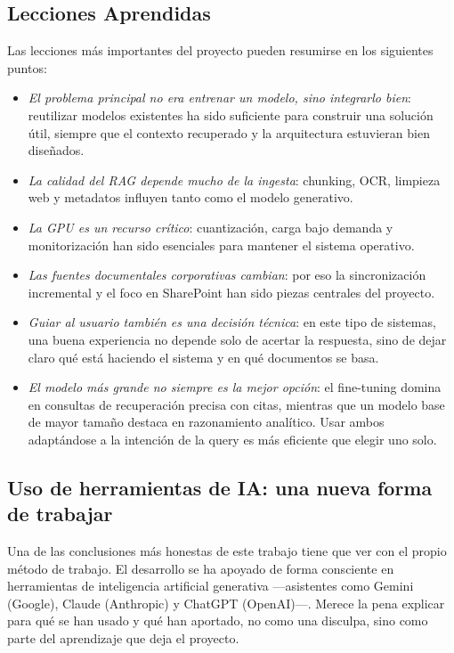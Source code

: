 \subsection{Lecciones Aprendidas}

Las lecciones más importantes del proyecto pueden resumirse en los siguientes puntos:

\begin{itemize}
    \item \textit{El problema principal no era entrenar un modelo, sino integrarlo bien}: reutilizar modelos existentes ha sido suficiente para construir una solución útil, siempre que el contexto recuperado y la arquitectura estuvieran bien diseñados.
    \item \textit{La calidad del RAG depende mucho de la ingesta}: chunking, OCR, limpieza web y metadatos influyen tanto como el modelo generativo.
    \item \textit{La GPU es un recurso crítico}: cuantización, carga bajo demanda y monitorización han sido esenciales para mantener el sistema operativo.
    \item \textit{Las fuentes documentales corporativas cambian}: por eso la sincronización incremental y el foco en SharePoint han sido piezas centrales del proyecto.
    \item \textit{Guiar al usuario también es una decisión técnica}: en este tipo de sistemas, una buena experiencia no depende solo de acertar la respuesta, sino de dejar claro qué está haciendo el sistema y en qué documentos se basa.
    \item \textit{El modelo más grande no siempre es la mejor opción}: el fine-tuning domina en consultas de recuperación precisa con citas, mientras que un modelo base de mayor tamaño destaca en razonamiento analítico. Usar ambos adaptándose a la intención de la query es más eficiente que elegir uno solo.
\end{itemize}

\subsection{Uso de herramientas de IA: una nueva forma de trabajar}
\label{subsec:uso-ia}

Una de las conclusiones más honestas de este trabajo tiene que ver con el propio método de trabajo. El desarrollo se ha apoyado de forma consciente en herramientas de inteligencia artificial generativa ---asistentes como Gemini (Google), Claude (Anthropic) y ChatGPT (OpenAI)---. Merece la pena explicar para qué se han usado y qué han aportado, no como una disculpa, sino como parte del aprendizaje que deja el proyecto.

